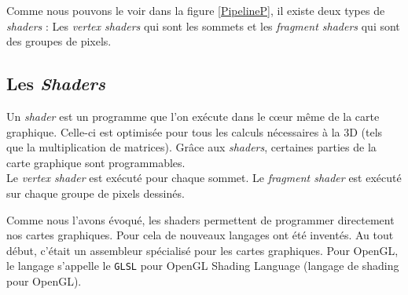 \documentclass[11pt]{report}
\begin{document}
Comme nous pouvons le voir dans la figure \ref{PipelineP}, il existe deux types de \textit{shaders} : Les \textit{vertex shaders} qui sont les sommets et les \textit{fragment shaders} qui sont des groupes de pixels.

\subsection{Les \textit{Shaders}}

Un \textit{shader} est un programme que l'on exécute dans le cœur même de la carte graphique. Celle-ci est optimisée pour tous les calculs nécessaires à la 3D (tels que la multiplication de matrices). Grâce aux \textit{shaders}, certaines parties de la carte graphique sont programmables. 
\\

    Le \textit{vertex shader} est exécuté pour chaque sommet.
    Le \textit{fragment shader} est exécuté sur chaque groupe de pixels dessinés. %



Comme nous l'avons évoqué, les shaders permettent de programmer directement nos cartes graphiques. Pour cela de nouveaux langages ont été inventés. Au tout début, c'était un assembleur spécialisé pour les cartes graphiques. Pour OpenGL, le langage s'appelle le \texttt{GLSL} pour OpenGL Shading Language (langage de shading pour OpenGL).
\end{document}
